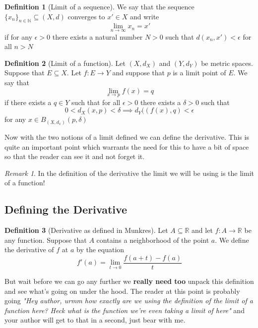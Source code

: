 \documentclass[12pt]{article}
\theoremstyle{definition}
\newtheorem{definition}{Definition}[section]
\theoremstyle{remark}
\newtheorem*{remark}{Remark}
\begin{document}
	
	\begin{definition}[Limit of a sequence]
		We say that the sequence $\{x_n\}_{n \in \mathbb{N}} \subseteq (X, d)$ converges to $x' \in X$ and write $$\lim_{n \to \infty} x_n = x'$$ if for any $\epsilon > 0$ there exists a  natural number $N > 0$ such that $d(x_n, x') < \epsilon$ for all $n > N$
	\end{definition}
	

	
	\begin{definition}[Limit of a function]
		Let $(X, d_X)$ and $(Y, d_Y)$ be metric spaces. Suppose that $E \subseteq X$. Let $f : E \to Y$ and suppose that $p$ is a limit point of $E$. We say that $$\lim_{x \to p} f(x) = q$$ if there exists a $q \in Y$ such that for all $\epsilon > 0$ there exists a $\delta > 0$ such that $$0 < d_X(x, p) < \delta \implies d_Y((f(x), q) < \epsilon$$ for any $x \in B_{(X, d_x)}(p, \delta)$
	\end{definition}
	
	\newpage
	
	Now with the two notions of a limit defined we can define the derivative. This is quite an important point which warrants the need for this to have a bit of space so that the reader can see it and not forget it.
	\medskip
	\begin{remark}
		In the definition of the derivative the limit we will be using is the limit of a function!
	\end{remark}
	
	\subsection{Defining the Derivative}
	
	
	\begin{definition}[Derivative as defined in Munkres]
		Let $A \subseteq \mathbb{R}$ and let $f : A \to \mathbb{R}$ be any function. Suppose that $A$ contains a neighborhood of the point $a$. We define the derivative of $f$ at $a$ by the equation $$f'(a) = \lim_{t \to 0} \frac{f(a+t) - f(a)}{t}$$
	\end{definition}
	
	But wait before we can go any further we \textbf{really need too} unpack this definition and see what's going on under the hood. The reader at this point is probably going \textit{"Hey author, urmm how exactly are we using the definition of the limit of a function here? Heck what is the function we're even taking a limit of here"} and your author will get to that in a second, just bear with me. \\
		
\end{document}
